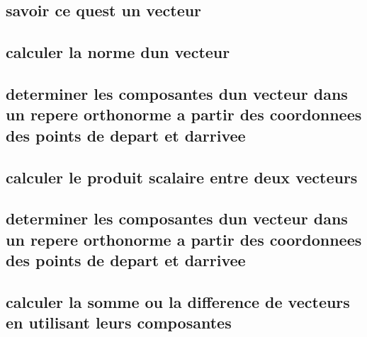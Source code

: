 \documentclass[11pt]{article}
\begin{document}
    \subsection{savoir ce quest un vecteur}
      
      
    \subsection{calculer la norme dun vecteur}
      
      
    \subsection{determiner les composantes dun vecteur dans un repere orthonorme a partir des coordonnees des points de depart et darrivee}
      
      
    \subsection{calculer le produit scalaire entre deux vecteurs}
      
      
    \subsection{determiner les composantes dun vecteur dans un repere orthonorme a partir des coordonnees des points de depart et darrivee}
      
      
    \subsection{calculer la somme ou la difference de vecteurs en utilisant leurs composantes}
      
      
\end{document}
